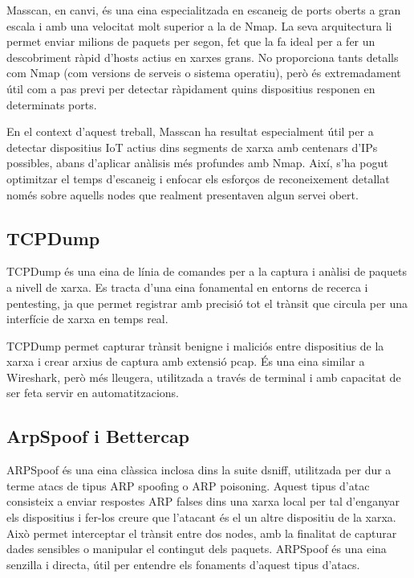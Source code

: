     Masscan, en canvi, és una eina especialitzada en escaneig de ports oberts a gran escala i amb una velocitat molt superior a la de Nmap. La seva arquitectura li permet enviar milions de paquets per segon, fet que la fa ideal per a fer un descobriment ràpid d’hosts actius en xarxes grans. No proporciona tants detalls com Nmap (com versions de serveis o sistema operatiu), però és extremadament útil com a pas previ per detectar ràpidament quins dispositius responen en determinats ports.

    En el context d’aquest treball, Masscan ha resultat especialment útil per a detectar dispositius IoT actius dins segments de xarxa amb centenars d’IPs possibles, abans d’aplicar anàlisis més profundes amb Nmap. Així, s’ha pogut optimitzar el temps d’escaneig i enfocar els esforços de reconeixement detallat només sobre aquells nodes que realment presentaven algun servei obert.

    \subsection{TCPDump}
    \label{sec:TCPDump}
    TCPDump és una eina de línia de comandes per a la captura i anàlisi de paquets a nivell de xarxa. Es tracta d’una eina fonamental en entorns de recerca i pentesting, ja que permet registrar amb precisió tot el trànsit que circula per una interfície de xarxa en temps real. \cite{wtfexp}
    
    TCPDump permet capturar trànsit benigne i maliciós entre dispositius de la xarxa i crear arxius de captura amb extensió pcap. És una eina similar a Wireshark, però més lleugera, utilitzada a través de terminal i amb capacitat de ser feta servir en automatitzacions.

    \subsection{ArpSpoof i Bettercap}
    \label{sec:ARPSpoof}
    ARPSpoof és una eina clàssica inclosa dins la suite dsniff, utilitzada per dur a terme atacs de tipus ARP spoofing o ARP poisoning. Aquest tipus d’atac consisteix a enviar respostes ARP falses dins una xarxa local per tal d’enganyar els dispositius i fer-los creure que l’atacant és el un altre dispositiu de la xarxa. Això permet interceptar el trànsit entre dos nodes, amb la finalitat de capturar dades sensibles o manipular el contingut dels paquets. ARPSpoof és una eina senzilla i directa, útil per entendre els fonaments d’aquest tipus d’atacs.

